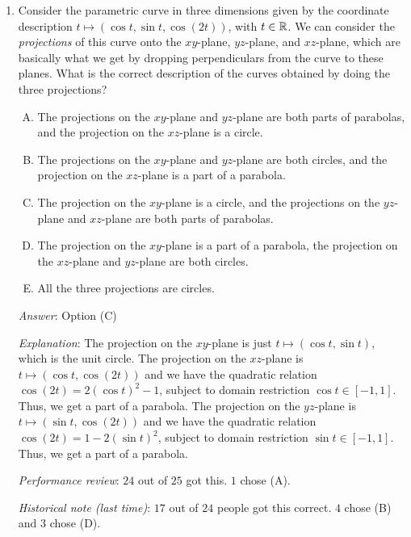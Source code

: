 \documentclass[10pt]{amsart}
\begin{document}
\begin{enumerate}
  {\em Performance review}: $5$ out of $25$ got this. $7$ chose (C),
  $6$ each chose (B) and (D), $1$ chose (E).

\item Consider the parametric curve in three dimensions given by the
  coordinate description $t \mapsto (\cos t, \sin t, \cos(2t))$, with
  $t \in \mathbb{R}$. We can consider the {\em projections} of this curve onto
  the $xy$-plane, $yz$-plane, and $xz$-plane, which are basically what
  we get by dropping perpendiculars from the curve to these
  planes. What is the correct description of the curves obtained by
  doing the three projections?

  \begin{enumerate}[(A)]
  \item The projections on the $xy$-plane and $yz$-plane are both parts
    of parabolas, and the projection on the $xz$-plane is a circle.
  \item The projections on the $xy$-plane and $yz$-plane are both
    circles, and the projection on the $xz$-plane is a part of a
    parabola.
  \item The projection on the $xy$-plane is a circle, and the
    projections on the $yz$-plane and $xz$-plane are both parts of
    parabolas.
  \item The projection on the $xy$-plane is a part of a parabola, the
    projection on the $xz$-plane and $yz$-plane are both circles.
  \item All the three projections are circles.
  \end{enumerate}

  {\em Answer}: Option (C)

  {\em Explanation}: The projection on the $xy$-plane is just $t
  \mapsto (\cos t, \sin t)$, which is the unit circle. The projection
  on the $xz$-plane is $t \mapsto (\cos t, \cos(2t))$ and we have the
  quadratic relation $\cos(2t) = 2 (\cos t)^2 - 1$, subject to domain
  restriction $\cos t \in [-1,1]$. Thus, we get a part of a
  parabola. The projection on the $yz$-plane is $t \mapsto (\sin t,
  \cos(2t))$ and we have the quadratic relation $\cos(2t) = 1 - 2(\sin
  t)^2$, subject to domain restriction $\sin t \in [-1,1]$. Thus, we
  get a part of a parabola.

  {\em Performance review}: $24$ out of $25$ got this. $1$ chose (A).

  {\em Historical note (last time)}: $17$ out of $24$ people got this
  correct. $4$ chose (B) and $3$ chose (D).
\end{enumerate}
\end{document}

